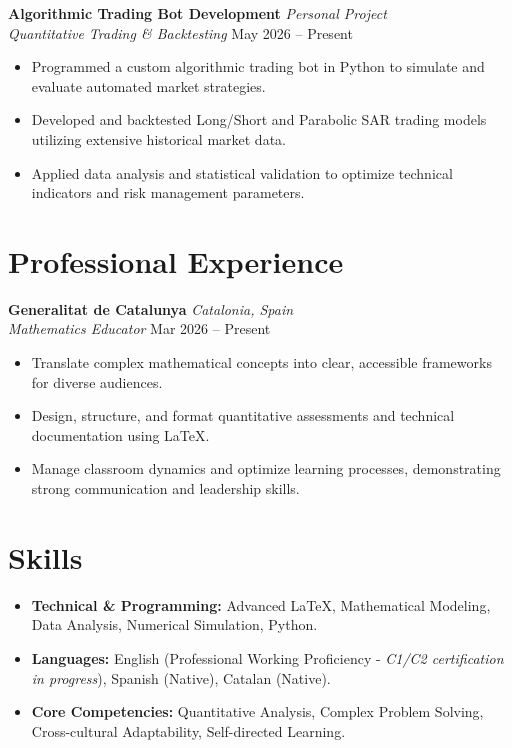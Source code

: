 \documentclass[11pt,a4paper]{article}
\newcommand{\cventry}[4]{
    \noindent \textbf{#1} \hfill \textit{#2} \\
    \noindent \textit{#3} \hfill #4 \vspace{3pt}
}
\begin{document}
\cventry{Algorithmic Trading Bot Development}{Personal Project}{Quantitative Trading \& Backtesting}{May 2026 -- Present}
\begin{itemize}[leftmargin=*, nosep]
    \item Programmed a custom algorithmic trading bot in Python to simulate and evaluate automated market strategies.
    \item Developed and backtested Long/Short and Parabolic SAR trading models utilizing extensive historical market data.
    \item Applied data analysis and statistical validation to optimize technical indicators and risk management parameters.
\end{itemize}

\section{Professional Experience}

\cventry{Generalitat de Catalunya}{Catalonia, Spain}{Mathematics Educator}{Mar 2026 -- Present}
\begin{itemize}[leftmargin=*, nosep]
    \item Translate complex mathematical concepts into clear, accessible frameworks for diverse audiences.
    \item Design, structure, and format quantitative assessments and technical documentation using LaTeX.
    \item Manage classroom dynamics and optimize learning processes, demonstrating strong communication and leadership skills.
\end{itemize}


\section{Skills}

\begin{itemize}[leftmargin=*, nosep]
    \item \textbf{Technical \& Programming:} Advanced LaTeX, Mathematical Modeling, Data Analysis, Numerical Simulation, Python.
    \item \textbf{Languages:} English (Professional Working Proficiency - \textit{C1/C2 certification in progress}), Spanish (Native), Catalan (Native).
    \item \textbf{Core Competencies:} Quantitative Analysis, Complex Problem Solving, Cross-cultural Adaptability, Self-directed Learning.
\end{itemize}
\end{document}
